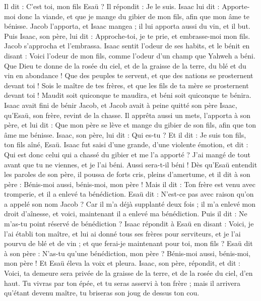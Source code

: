 \begin{multicols}{2}
Il dit : C’est toi, mon fils Esaü ? Il répondit : Je le suis.
Isaac lui dit : Apporte-moi donc la viande, et que je mange du gibier de mon fils, afin que mon âme te bénisse. Jacob l'apporta, et Isaac mangea ; il lui apporta aussi du vin, et il but.
Puis Isaac, son père, lui dit : Approche-toi, je te prie, et embrasse-moi mon fils.
Jacob s'approcha et l’embrassa. Isaac sentit l'odeur de ses habits, et le bénit en disant : Voici l'odeur de mon fils, comme l'odeur d'un champ que Yahweh a béni.
Que Dieu te donne de la rosée du ciel, et de la graisse de la terre, du blé et du vin en abondance !
Que des peuples te servent, et que des nations se prosternent devant toi ! Sois le maître de tes frères, et que les fils de ta mère se prosternent devant toi ! Maudit soit quiconque te maudira, et béni soit quiconque te bénira.
Isaac avait fini de bénir Jacob, et Jacob avait à peine quitté son père Isaac, qu’Esaü, son frère, revint de la chasse.
Il apprêta aussi un mets, l’apporta à son père, et lui dit : Que mon père se lève et mange du gibier de son fils, afin que ton âme me bénisse.
Isaac, son père, lui dit : Qui es-tu ? Et il dit : Je suis ton fils, ton fils aîné, Esaü.
Isaac fut saisi d'une grande, d’une violente émotion, et dit : Qui est donc celui qui a chassé du gibier et me l’a apporté ? J'ai mangé de tout avant que tu ne viennes, et je l'ai béni. Aussi sera-t-il béni !
Dès qu'Esaü entendit les paroles de son père, il poussa de forts cris, pleins d’amertume, et il dit à son père : Bénis-moi aussi, bénis-moi, mon père !
Mais il dit : Ton frère est venu avec tromperie, et il a enlevé ta bénédiction.
Esaü dit : N'est-ce pas avec raison qu'on a appelé son nom Jacob ? Car il m'a déjà supplanté deux fois ; il m'a enlevé mon droit d'aînesse, et voici, maintenant il a enlevé ma bénédiction. Puis il dit : Ne m'as-tu point réservé de bénédiction ?
Isaac répondit à Esaü en disant : Voici, je l'ai établi ton maître, et lui ai donné tous ses frères pour serviteurs, et je l'ai pourvu de blé et de vin ; et que ferai-je maintenant pour toi, mon fils ?
Esaü dit à son père : N'as-tu qu'une bénédiction, mon père ? Bénis-moi aussi, bénis-moi, mon père ! Et Esaü éleva la voix et pleura.
Isaac, son père, répondit, et dit : Voici, ta demeure sera privée de la graisse de la terre, et de la rosée du ciel, d'en haut.
Tu vivras par ton épée, et tu seras asservi à ton frère ; mais il arrivera qu'étant devenu maître, tu briseras son joug de dessus ton cou.

\end{multicols}
